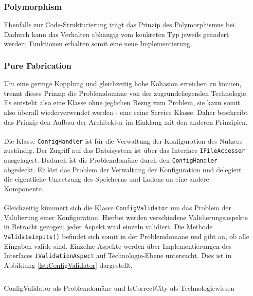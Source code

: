 
\subsubsection{Polymorphism}
Ebenfalls zur Code-Strukturierung trägt das Prinzip des Polymorphismus bei.
Dadurch kann das Verhalten abhängig vom konkreten Typ jeweils geändert werden; Funktionen erhalten somit eine neue Implementierung.

\subsubsection{Pure Fabrication}
Um eine geringe Kopplung und gleichzeitig hohe Kohäsion erreichen zu können, trennt dieses Prinzip die Problemdomäne von der zugrundeliegenden Technologie.
Es entsteht also eine Klasse ohne jeglichen Bezug zum Problem, sie kann somit also überall wiederverwendet werden - eine reine Service Klasse.
Daher beschreibt das Prinzip den Aufbau der Architektur im Einklang mit den anderen Prinzipien.\\
\\
Die Klasse \texttt{ConfigHandler} ist für die Verwaltung der Konfiguration des Nutzers zuständig.
Der Zugriff auf das Dateisystem ist über das Interface \texttt{IFileAccessor} ausgelagert.
Dadurch ist die Problemdomäne durch den \texttt{ConfigHandler} abgedeckt.
Er löst das Problem der Verwaltung der Konfiguration und delegiert die eigentliche Umsetzung des Speicherns und Ladens an eine andere Komponente.\\
\\
Gleichzeitig kümmert sich die Klasse \texttt{ConfigValidator} um das Problem der Validierung einer Konfiguration.
Hierbei werden verschiedene Validierungsaspekte in Betracht gezogen; jeder Aspekt wird einzeln validiert.
Die Methode \texttt{ValidateInputs()} befindet sich somit in der Problemdomäne und gibt an, ob alle Eingaben valide sind.
Einzelne Aspekte werden über Implementierungen des Interfaces \texttt{IValidationAspect} auf Technologie-Ebene untersucht. Dies ist in Abbildung \ref{lst:ConfigValidator} dargestellt.

\begin{listing}[tbt]
	\inputminted[linenos=true,frame=lines]{csharp}{Listings/ConfigValidator.cs}
	\caption{ConfigValidator als Problemdomäne und IsCorrectCity als Technologiewissen}
	\label{lst:ConfigValidator}
\end{listing}

